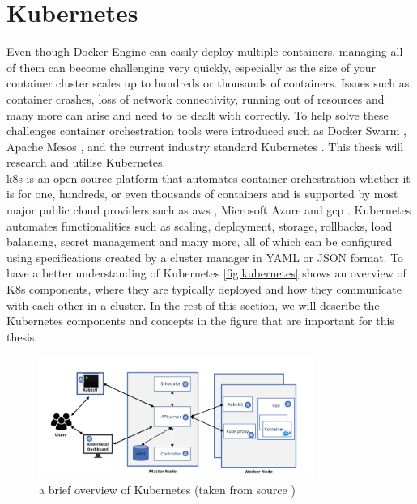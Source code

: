 \section{Kubernetes}\label{sec:kubernetes}

Even though Docker Engine can easily deploy multiple containers, managing all of them can become challenging very quickly, especially as the size of your container cluster scales up to hundreds or thousands of containers. Issues such as container crashes, loss of network connectivity, running out of resources and many more can arise and need to be dealt with correctly. To help solve these challenges container orchestration tools were introduced such as Docker Swarm \cite{dockerswarm}, Apache Mesos \cite{apachemesos}, and the current industry standard Kubernetes \cite{resman} \cite{CNCFSurvey}. This thesis will research and utilise Kubernetes.
\\[10pt]

\acrfull{k8s} is an open-source platform that automates container orchestration whether it is for one, hundreds, or even thousands of containers and is supported by most major public cloud providers such as \acrfull{aws} \cite{aws}, Microsoft Azure \cite{azure} and \acrfull{gcp} \cite{gcp}. Kubernetes automates functionalities such as scaling, deployment, storage, rollbacks, load balancing, secret management and many more, all of which can be configured using specifications created by a cluster manager in YAML or JSON format. To have a better understanding of Kubernetes \autoref{fig:kubernetes} shows an overview of K8s components, where they are typically deployed and how they communicate with each other in a cluster. In the rest of this section, we will describe the Kubernetes components and concepts in the figure that are important for this thesis. 
\\[10pt]
\begin{figure}[htbp]
  \centering
  \includegraphics[width=0.8\textwidth]{images/kubernetes-structure.png} 
  \caption{a brief overview of Kubernetes (taken from source \cite{IslamShamim2020a})}
  \label{fig:kubernetes}
\end{figure}

